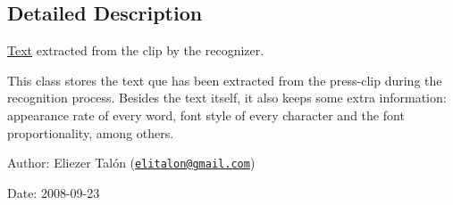 \subsection{Detailed Description}
\hyperlink{class_text}{Text} extracted from the clip by the recognizer. 

This class stores the text que has been extracted from the press-clip during the recognition process. Besides the text itself, it also keeps some extra information: appearance rate of every word, font style of every character and the font proportionality, among others.

\begin{Desc}
\item[Author:]Eliezer Talón (\href{mailto:elitalon@gmail.com}{\tt elitalon@gmail.com}) \end{Desc}
\begin{Desc}
\item[Date:]2008-09-23 \end{Desc}


